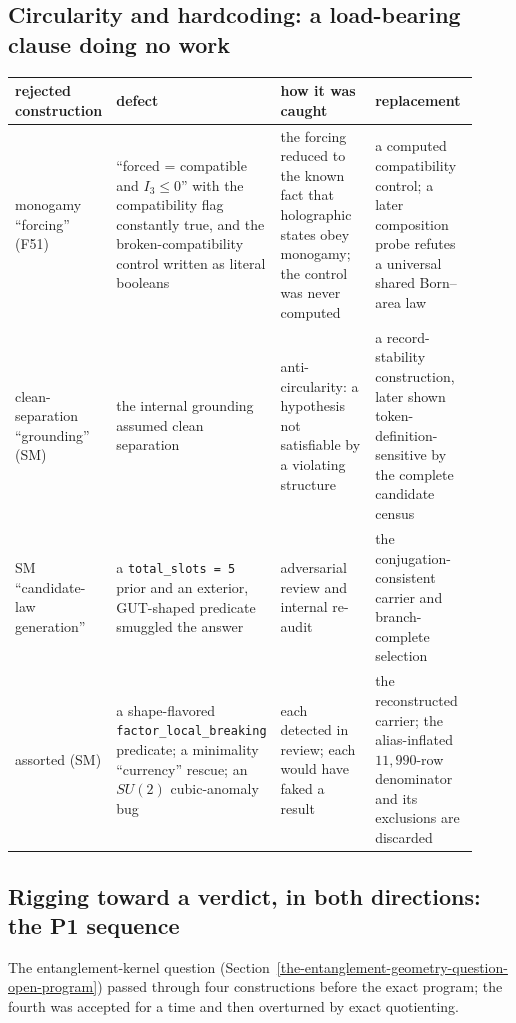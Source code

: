 \subsection{Circularity and hardcoding: a load-bearing clause doing no work}\label{circularity-and-hardcoding-the-load-bearing-clause-doing-no-work}

\begin{center}
\small
\begin{longtable}[]{@{}p{0.2\linewidth}p{0.27\linewidth}p{0.22\linewidth}p{0.23\linewidth}@{}}
\toprule
rejected construction & defect & how it was caught & replacement\\
\midrule
\endhead
monogamy ``forcing'' (F51) & ``forced = compatible and \(I_3\le0\)'' with the compatibility flag constantly true, and
the broken-compatibility control written as literal booleans & the forcing reduced to the known fact that holographic
states obey monogamy; the control was never computed & a computed compatibility control; a later composition probe
refutes a universal shared Born--area law\\
clean-separation ``grounding'' (SM) & the internal grounding assumed clean separation & anti-circularity: a hypothesis
not satisfiable by a violating structure & a record-stability construction, later shown token-definition-sensitive by
the complete candidate census\\
SM ``candidate-law generation'' & a \texttt{total\_slots = 5} prior and an exterior, GUT-shaped predicate smuggled the
answer & adversarial review and internal re-audit & the conjugation-consistent carrier and branch-complete
selection\\
assorted (SM) & a shape-flavored \texttt{factor\_local\_breaking} predicate; a minimality ``currency'' rescue; an
\(SU(2)\) cubic-anomaly bug & each detected in review; each would have faked a result & the reconstructed carrier; the
alias-inflated \(11{,}990\)-row denominator and its exclusions are discarded\\
\bottomrule
\end{longtable}
\end{center}

\subsection{Rigging toward a verdict, in both directions: the P1 sequence}\label{rigging-toward-a-desired-verdict-both-directions-prediction-1s-four-attempts}

The entanglement-kernel question (Section~\ref{the-entanglement-geometry-question-open-program}) passed through four
constructions before the exact program; the fourth was accepted for a time and then overturned by exact quotienting.

